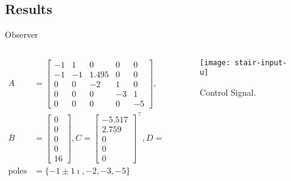 
\subsection{Results}%
\label{subsec:ts-results}

\begin{slide}{Observer}
  \begin{columns}[c]
    \begin{column}{0.55\textwidth}
      \begin{align}
        A              & = \begin{bmatrix}
                             -1 & 1  & 0     & 0  & 0  \\
                             -1 & -1 & 1.495 & 0  & 0  \\
                             0  & 0  & -2    & 1  & 0  \\
                             0  & 0  & 0     & -3 & 1  \\
                             0  & 0  & 0     & 0  & -5
                           \end{bmatrix},        \\
        B              & =\begin{bmatrix}
                            0 \\ 0 \\ 0 \\ 0 \\ 16
                          \end{bmatrix},
        C = \begin{bmatrix}
              -5.517 \\ 2.759 \\ 0 \\ 0 \\ 0
            \end{bmatrix}^{\top},
        D = 0                                               \\
        \textrm{poles} & = \{-1\pm{}1\imath{}, -2, -3, -5\}
      \end{align}
    \end{column}%
    \hfill%
    \begin{column}{0.55\textwidth}
      \begin{figure}[ht!]
        \centering
        \texttt{[image: stair-input-u]}
        \caption{Control Signal.}%
      \end{figure}
    \end{column}%
  \end{columns}
\end{slide}

